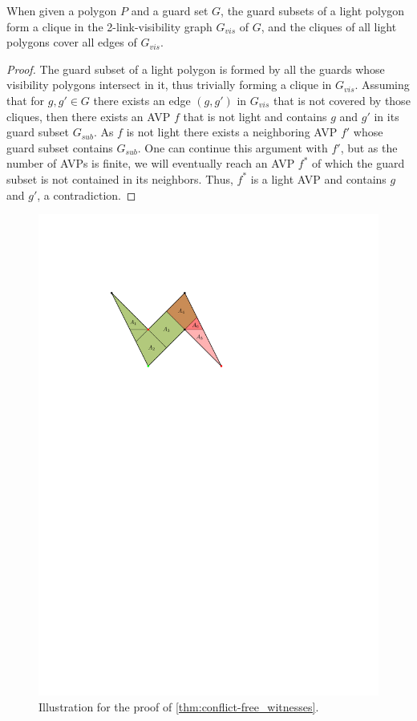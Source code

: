 \begin{theorem}\label{thm:light_covers}
When given a polygon $P$ and a guard set $G$, the guard subsets of a light polygon form a clique in the 2-link-visibility graph $G_{vis}$ of $G$, and the cliques of all light polygons cover all edges of $G_{vis}$.
\end{theorem}
\begin{proof}
The guard subset of a light polygon is formed by all the guards whose visibility polygons intersect in it, thus trivially forming a clique in $G_{vis}$. Assuming that for $g,g'\in G$ there exists an edge $(g, g')$ in $G_{vis}$ that is not covered by those cliques, then there exists an AVP $f$ that is not light and contains $g$ and $g'$ in its guard subset $G_{sub}$. As $f$ is not light there exists a neighboring AVP $f'$ whose guard subset contains $G_{sub}$. One can continue this argument with $f'$, but as the number of AVPs is finite, we will eventually reach an AVP $f^{*}$ of which the guard subset is not contained in its neighbors. Thus, $f^{*}$ is a light AVP and contains $g$ and $g'$, a contradiction.
\end{proof}

\begin{figure}[htbp]
\centering
\includegraphics[scale=1.3]{Thesis/figures/conflict-free_witnesses_updated.pdf}
\caption{Illustration for the proof of \cref{thm:conflict-free_witnesses}.}
\label{fig:conflict-free_witnesses}
\end{figure}

